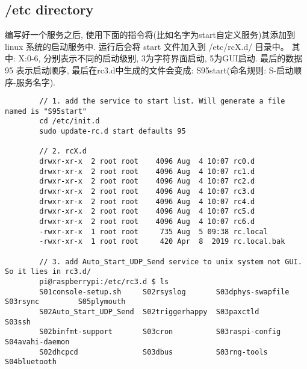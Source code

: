 \subsection{/etc directory}
    编写好一个服务之后, 使用下面的指令将(比如名字为start自定义服务)其添加到 linux 系统的启动服务中. 运行后会将 start 文件加入到 /etc/rcX.d/ 目录中。
    其中: X:0-6, 分别表示不同的启动级别, 3为字符界面启动, 5为GUI启动. 最后的数据 95 表示启动顺序, 最后在rc3.d中生成的文件会变成: S95start(命名规则: S-启动顺序-服务名字). 

    \begin{lstlisting}
        // 1. add the service to start list. Will generate a file named is "S95start"
        cd /etc/init.d
        sudo update-rc.d start defaults 95

        // 2. rcX.d
        drwxr-xr-x  2 root root    4096 Aug  4 10:07 rc0.d
        drwxr-xr-x  2 root root    4096 Aug  4 10:07 rc1.d
        drwxr-xr-x  2 root root    4096 Aug  4 10:07 rc2.d
        drwxr-xr-x  2 root root    4096 Aug  4 10:07 rc3.d
        drwxr-xr-x  2 root root    4096 Aug  4 10:07 rc4.d
        drwxr-xr-x  2 root root    4096 Aug  4 10:07 rc5.d
        drwxr-xr-x  2 root root    4096 Aug  4 10:07 rc6.d
        -rwxr-xr-x  1 root root     735 Aug  5 09:38 rc.local
        -rwxr-xr-x  1 root root     420 Apr  8  2019 rc.local.bak

        // 3. add Auto_Start_UDP_Send service to unix system not GUI. So it lies in rc3.d/
        pi@raspberrypi:/etc/rc3.d $ ls
        S01console-setup.sh     S02rsyslog       S03dphys-swapfile  S03rsync         S05plymouth
        S02Auto_Start_UDP_Send  S02triggerhappy  S03paxctld         S03ssh
        S02binfmt-support       S03cron          S03raspi-config    S04avahi-daemon
        S02dhcpcd               S03dbus          S03rng-tools       S04bluetooth

    \end{lstlisting}